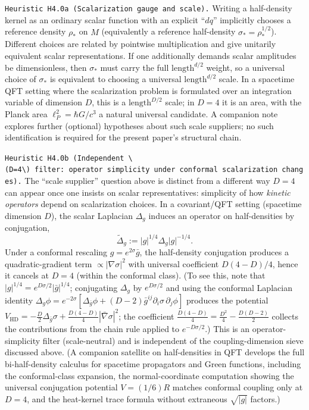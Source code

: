 \documentclass[
]{article}
\begin{document}
\texttt{Heuristic\ H4.0a\ (Scalarization\ gauge\ and\ scale).} Writing a
half-density kernel as an ordinary scalar function with an explicit
``\(dq\)'' implicitly chooses a reference density \(\rho_\ast\) on \(M\)
(equivalently a reference half-density \(\sigma_\ast=\rho_\ast^{1/2}\)).
Different choices are related by pointwise multiplication and give
unitarily equivalent scalar representations. If one additionally demands
scalar amplitudes be dimensionless, then \(\sigma_\ast\) must carry the
full \(\text{length}^{d/2}\) weight, so a universal choice of
\(\sigma_\ast\) is equivalent to choosing a universal
\(\text{length}^{d/2}\) scale. In a spacetime QFT setting where the
scalarization problem is formulated over an integration variable of
dimension \(D\), this is a \(\text{length}^{D/2}\) scale; in \(D=4\) it
is an area, with the Planck area \(\ell_P^2=\hbar G/c^3\) a natural
universal candidate. A companion note explores further (optional)
hypotheses about such scale suppliers; no such identification is
required for the present paper's structural chain.

\texttt{Heuristic\ H4.0b\ (Independent\ \textbackslash{}(D=4\textbackslash{})\ filter:\ operator\ simplicity\ under\ conformal\ scalarization\ changes).}
The ``scale supplier'' question above is distinct from a different way
\(D=4\) can appear once one insists on scalar representatives:
simplicity of how \emph{kinetic operators} depend on scalarization
choices. In a covariant/QFT setting (spacetime dimension \(D\)), the
scalar Laplacian \(\Delta_g\) induces an operator on half-densities by
conjugation, \[
\widetilde\Delta_g := |g|^{1/4}\Delta_g|g|^{-1/4}.
\] Under a conformal rescaling \(g=e^{2\sigma}\bar g\), the half-density
conjugation produces a quadratic-gradient term
\(\propto |\nabla\sigma|^2\) with universal coefficient \(D(4-D)/4\),
hence it cancels at \(D=4\) (within the conformal class). (To see this,
note that \(|g|^{1/4}=e^{D\sigma/2}|\bar g|^{1/4}\); conjugating
\(\Delta_g\) by \(e^{D\sigma/2}\) and using the conformal Laplacian
identity
\(\Delta_g\phi=e^{-2\sigma}[\Delta_{\bar g}\phi+(D{-}2)\bar g^{ij}\partial_i\sigma\,\partial_j\phi]\)
produces the potential
\(V_{\mathrm{HD}}=-\tfrac{D}{2}\Delta_{\bar g}\sigma+\tfrac{D(4-D)}{4}|\bar\nabla\sigma|^2\);
the coefficient \(\tfrac{D(4-D)}{4}=\tfrac{D^2}{4}-\tfrac{D(D-2)}{2}\)
collects the contributions from the chain rule applied to
\(e^{-D\sigma/2}\).) This is an operator-simplicity filter
(scale-neutral) and is independent of the coupling-dimension sieve
discussed above. (A companion satellite on half-densities in QFT
develops the full bi-half-density calculus for spacetime propagators and
Green functions, including the conformal-class expansion, the
normal-coordinate computation showing the universal conjugation
potential \(V=(1/6)R\) matches conformal coupling only at \(D=4\), and
the heat-kernel trace formula without extraneous \(\sqrt{|g|}\)
factors.)
\end{document}
